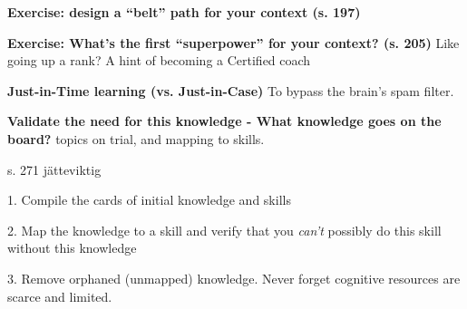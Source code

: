 \textbf{Exercise: design a “belt” path for your context (s. 197)}

\textbf{Exercise: What’s the first “superpower” for your context? (s. 205)}
Like going up a rank?
A hint of becoming a Certified coach

\textbf{Just-in-Time learning (vs. Just-in-Case)}
To bypass the brain's spam filter.

\textbf{Validate the need for this knowledge - What knowledge goes on the board?}
topics on trial, and mapping to skills.

s. 271 jätteviktig

1. Compile the cards of initial knowledge and skills

2. Map the knowledge to a skill and verify that you \textit{can’t} possibly do this skill without this knowledge

3. Remove orphaned (unmapped) knowledge. Never forget cognitive resources are scarce and limited.
